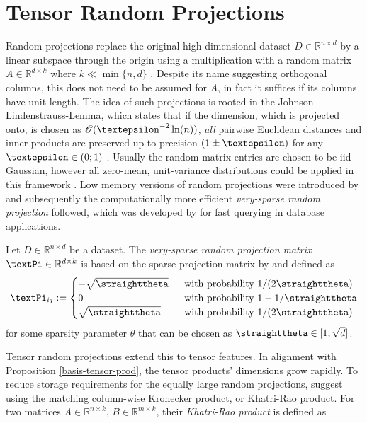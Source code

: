 \documentclass[openany]{book}
\begin{document}
\section{Tensor Random Projections}
Random projections replace the original high-dimensional dataset $D\in \mathbb R^{n\times d}$ by a linear subspace through the origin using a multiplication with a random matrix $A\in \mathbb R^{d\times k}$ where $k\ll \min\{n,d\}$ \cite{bingham2001}. Despite its name suggesting orthogonal columns, this does not need to be assumed for $A$, in fact it suffices if its columns have unit length. The idea of such projections is rooted in the Johnson-Lindenstrauss-Lemma, which states that if the dimension, which is projected onto, is chosen as $\mathscr O(\gepsilon^{-2}\ln(n))$, \textit{all} pairwise Euclidean distances and inner products are preserved up to precision $(1\pm\gepsilon)$ for any $\gepsilon\in (0;1)$ \cite{dasgupta2003}. Usually the random matrix entries are chosen to be iid Gaussian, however all zero-mean, unit-variance distributions could be applied in this framework \cite{bingham2001}. Low memory versions of random projections were introduced by \cite{achlioptas2001} and subsequently the computationally more efficient \textit{very-sparse random projection} followed, which was developed by \cite{ping2006} for fast querying in database applications. 
\begin{definition}\label{very-sparse-rp-def}
    Let $D\in \mathbb R^{n\times d}$ be a dataset. The \textit{very-sparse random projection matrix} $\gPi\in \mathbb R^{d\times k}$ is based on the sparse projection matrix by \cite{achlioptas2001} and defined as
    \begin{equation*}
        \gPi_{ij}:=\begin{cases}
            -\sqrt{\gtheta}\;&\textrm{ with probability }1/(2\gtheta)\\0\;&\textrm{ with probability }1-1/\gtheta\\\sqrt{\gtheta}\;&\textrm{ with probability }1/(2\gtheta)
        \end{cases}
    \end{equation*}
    for some sparsity parameter $\theta$ that can be chosen as $\gtheta\in [1,\sqrt{d}]$. 
\end{definition}
Tensor random projections extend this to tensor features. In alignment with Proposition \ref{basis-tensor-prod}, the tensor products' dimensions grow rapidly. To reduce storage requirements for the equally large random projections, \cite{sun2021} suggest using the matching column-wise Kronecker product, or Khatri-Rao product. For two matrices $A\in \mathbb R^{n\times k}$, $B\in \mathbb R^{m\times k}$, their \textit{Khatri-Rao product} is defined as
\end{document}
